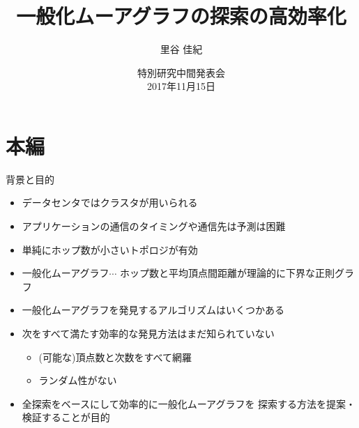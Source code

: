 \documentclass[dvipdfmx]{beamer}
\title{一般化ムーアグラフの探索の高効率化}
\author{里谷 佳紀}
\institute{高橋研究室}
\date[特別研究中間発表会]{特別研究中間発表会 \\ 2017年11月15日}
\theoremstyle{definition}
\begin{document}
\begin{frame}
  \maketitle
\end{frame}

\section{本編}
\begin{frame}{背景と目的}
  \begin{itemize}
  \item データセンタではクラスタが用いられる
  \item アプリケーションの通信のタイミングや通信先は予測は困難
  \item 単純にホップ数が小さいトポロジが有効\cite{Koibuchi2012, Singla2011}
  \item \alert{一般化ムーアグラフ}$\cdots$
    ホップ数と平均頂点間距離が理論的に下界な正則グラフ
    \cite{cerf1973computer, Cerf1974}
  \item 一般化ムーアグラフを発見するアルゴリズムはいくつかある
    \cite{Sampels2004, 2015, 2016}
  \item 次をすべて満たす効率的な発見方法はまだ知られていない
    \begin{itemize}
    \item (可能な)頂点数と次数をすべて網羅
    \item ランダム性がない
    \end{itemize}
  \item 全探索をベースにして効率的に一般化ムーアグラフを
    探索する方法を提案・検証することが目的
  \end{itemize}
\end{frame}
\end{document}
